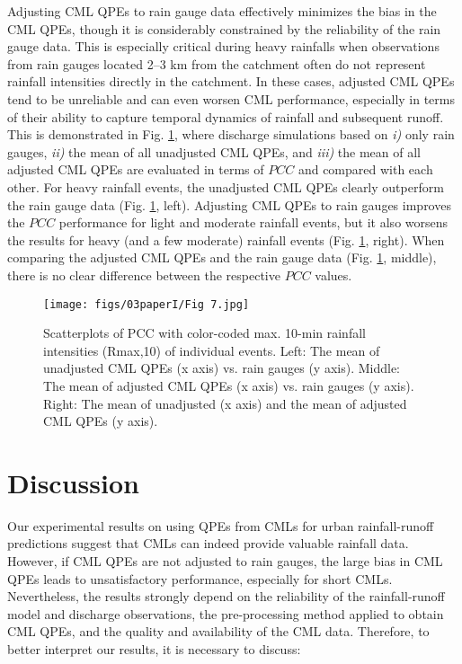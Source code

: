 \documentclass{ctuthesis}\usepackage[]{graphicx}\usepackage[]{color}
\begin{document}
Adjusting CML QPEs to rain gauge data effectively minimizes the bias in the CML QPEs, though it is considerably constrained by the reliability of the rain gauge data. This is especially critical during heavy rainfalls when observations from rain gauges located 2--3 km from the catchment often do not represent rainfall intensities directly in the catchment. In these cases, adjusted CML QPEs tend to be unreliable and can even worsen CML performance, especially in terms of their ability to capture temporal dynamics of rainfall and subsequent runoff. This is demonstrated in Fig. \ref{3fig7}, where discharge simulations based on \emph{i)} only rain gauges, \emph{ii)} the mean of all unadjusted CML QPEs, and \emph{iii)} the mean of all adjusted CML QPEs are evaluated in terms of $PCC$ and compared with each other. For heavy rainfall events, the unadjusted CML QPEs clearly outperform the rain gauge data (Fig. \ref{3fig7}, left). Adjusting CML QPEs to rain gauges improves the $PCC$ performance for light and moderate rainfall events, but it also worsens the results for heavy (and a few moderate) rainfall events (Fig. \ref{3fig7}, right). When comparing the adjusted CML QPEs and the rain gauge data (Fig. \ref{3fig7}, middle), there is no clear difference between the respective $PCC$ values.


\begin{figure}[h]
\begin{center}
\texttt{[image: figs/03paperI/Fig 7.jpg]}
\caption{Scatterplots of PCC with color-coded max. 10-min rainfall intensities (Rmax,10) of individual events. Left: The mean of unadjusted CML QPEs (x axis) vs. rain gauges (y axis). Middle: The mean of adjusted CML QPEs (x axis) vs. rain gauges (y axis). Right: The mean of unadjusted (x axis) and the mean of adjusted CML QPEs (y axis).} \label{3fig7}
\end{center}
\end{figure}



\section{Discussion}

Our experimental results on using QPEs from CMLs for urban rainfall-runoff predictions suggest that CMLs can indeed provide valuable rainfall data. However, if CML QPEs are not adjusted to rain gauges, the large bias in CML QPEs leads to unsatisfactory performance, especially for short CMLs. Nevertheless, the results strongly depend on the reliability of the rainfall-runoff model and discharge observations, the pre-processing method applied to obtain CML QPEs, and the quality and availability of the CML data. Therefore, to better interpret our results, it is necessary to discuss:
\end{document}
